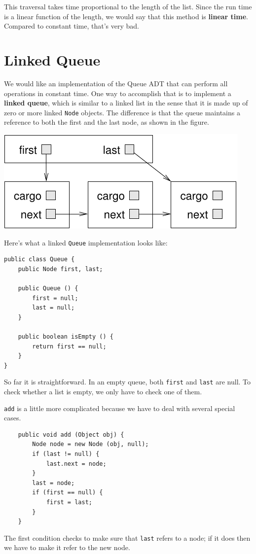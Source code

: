 \documentclass[12pt]{book}
\theoremstyle{exercise}
\begin{document}
This traversal takes time proportional to the length of the
list.  Since the run time is a linear function of the length,
we would say that this method is {\bf linear time}.  Compared to
constant time, that's very bad. 



\section{Linked Queue}

We would like an implementation of the Queue ADT that can
perform all operations in constant time.  One way to
accomplish that is to implement a {\bf linked queue}, which
is similar to a linked list in the sense that it is made up
of zero or more linked {\tt Node} objects.  The difference
is that the queue
maintains a reference to both the first and the last node,
as shown in the figure.

\includegraphics{figs/queue1.pdf}

Here's what a linked {\tt Queue} implementation looks like:

\begin{verbatim}
public class Queue {
    public Node first, last;

    public Queue () {
        first = null;
        last = null;
    }

    public boolean isEmpty () {
        return first == null;
    }
}
\end{verbatim}
%
So far it is straightforward.  In an empty queue, both {\tt first}
and {\tt last} are null.  To check whether a list is empty, we only
have to check one of them.

{\tt add} is a little more complicated because we have to
deal with several special cases.

\begin{verbatim}
    public void add (Object obj) {
        Node node = new Node (obj, null);
        if (last != null) {
            last.next = node;
        }
        last = node;
        if (first == null) {
            first = last;
        }
    }
\end{verbatim}
%
The first condition checks to make sure that {\tt last} refers
to a node; if it does then we have to make it refer to the new
node.
\end{document}
